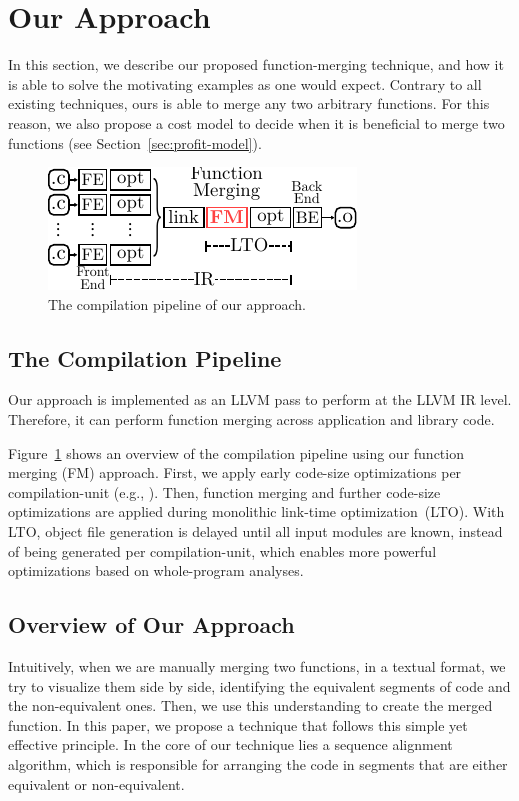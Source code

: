 \section{Our Approach} \label{sec:fm}

In this section, we describe our proposed function-merging technique, and how it is able to solve the motivating examples as one would
expect. Contrary to all existing techniques, ours is able to merge any two arbitrary functions. For this reason, we also propose a cost
model to decide when it is beneficial to merge two functions (see Section~\ref{sec:profit-model}).

\begin{figure}[t!]
  \centering
  \includegraphics[width=0.7\linewidth]{figs/opt-pipeline.pdf}
  \caption{The compilation pipeline of our approach.}
  \label{fig:opt-pipeline}
\end{figure}

\subsection{The Compilation Pipeline}
Our approach is implemented as an LLVM pass to perform at the LLVM IR level. Therefore, it can perform function merging across application
and library code.

Figure~\ref{fig:opt-pipeline} shows an overview of the compilation pipeline using our function merging (FM) approach. First, we apply early
code-size optimizations per compilation-unit (e.g., ). Then, function merging and further code-size
optimizations are applied during monolithic link-time optimization~(LTO). With LTO, object file generation is delayed until all input
modules are known, instead of being generated per
compilation-unit, which enables more powerful optimizations based on whole-program analyses. %

\subsection{Overview of Our Approach}
Intuitively, when we are manually merging two functions, in a textual format, we try to visualize them side by side, identifying the
equivalent segments of code and the non-equivalent ones. Then, we use this understanding to create the merged function. In this paper, we
propose a technique that follows this simple yet effective principle. In the core of our technique lies a sequence alignment algorithm,
which is responsible for arranging the code in segments that are either equivalent or non-equivalent.

